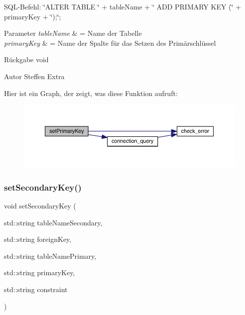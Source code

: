 S\+Q\+L-\/\+Befehl\+: \char`\"{}\+A\+L\+T\+E\+R T\+A\+B\+L\+E \char`\"{} + table\+Name + \char`\"{} A\+D\+D P\+R\+I\+M\+A\+R\+Y K\+E\+Y (\char`\"{} + primary\+Key + \char`\"{});\char`\"{};


\begin{DoxyParams}{Parameter}
{\em table\+Name} & = Name der Tabelle \\
\hline
{\em primary\+Key} & = Name der Spalte für das Setzen des Primärschlüssel\\
\hline
\end{DoxyParams}
\begin{DoxyReturn}{Rückgabe}
void
\end{DoxyReturn}
\begin{DoxyAuthor}{Autor}
Steffen Extra 
\end{DoxyAuthor}
Hier ist ein Graph, der zeigt, was diese Funktion aufruft\+:\nopagebreak
\begin{figure}[H]
\begin{center}
\leavevmode
\includegraphics[width=350pt]{tables_8hpp_aac2797835afcf68b73ba522e7bb91f5f_cgraph}
\end{center}
\end{figure}
\mbox{\label{tables_8hpp_a4aca01f302c4488d661196653d8f6c28}} 
\subsubsection{set\+Secondary\+Key()}
{\footnotesize\ttfamily void set\+Secondary\+Key (\begin{DoxyParamCaption}\item[{std\+::string}]{table\+Name\+Secondary,  }\item[{std\+::string}]{foreign\+Key,  }\item[{std\+::string}]{table\+Name\+Primary,  }\item[{std\+::string}]{primary\+Key,  }\item[{std\+::string}]{constraint }\end{DoxyParamCaption})}



